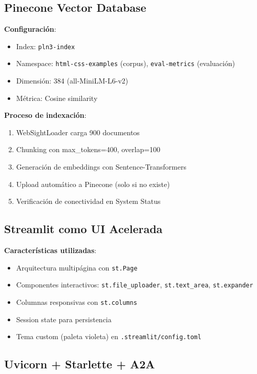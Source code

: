\documentclass[12pt,a4paper]{article}
\begin{document}
\subsection{Pinecone Vector Database}

\textbf{Configuración}:
\begin{itemize}
    \item Index: \texttt{pln3-index}
    \item Namespace: \texttt{html-css-examples} (corpus), \texttt{eval-metrics} (evaluación)
    \item Dimensión: 384 (all-MiniLM-L6-v2)
    \item Métrica: Cosine similarity
\end{itemize}

\textbf{Proceso de indexación}:
\begin{enumerate}
    \item WebSightLoader carga 900 documentos
    \item Chunking con max\_tokens=400, overlap=100
    \item Generación de embeddings con Sentence-Transformers
    \item Upload automático a Pinecone (solo si no existe)
    \item Verificación de conectividad en System Status
\end{enumerate}

\subsection{Streamlit como UI Acelerada}

\textbf{Características utilizadas}:
\begin{itemize}
    \item Arquitectura multipágina con \texttt{st.Page}
    \item Componentes interactivos: \texttt{st.file\_uploader}, \texttt{st.text\_area}, \texttt{st.expander}
    \item Columnas responsivas con \texttt{st.columns}
    \item Session state para persistencia
    \item Tema custom (paleta violeta) en \texttt{.streamlit/config.toml}
\end{itemize}

\subsection{Uvicorn + Starlette + A2A}
\end{document}
